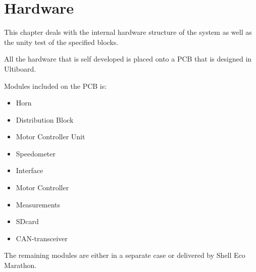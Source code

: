 \chapter{Hardware}
This chapter deals with the internal hardware structure of the system as well as the unity test of the specified blocks.

All the hardware that is self developed is placed onto a PCB that is designed in Ultiboard. 

Modules included on the PCB is:

\begin{itemize}
	\item{Horn}
	\item{Distribution Block}
	\item{Motor Controller Unit}
	\item{Speedometer}
	\item{Interface}
	\item{Motor Controller}
	\item{Measurements}
	\item{SDcard}
	\item{CAN-transceiver}
\end{itemize}

The remaining modules are either in a separate case or delivered by Shell Eco Marathon. 














